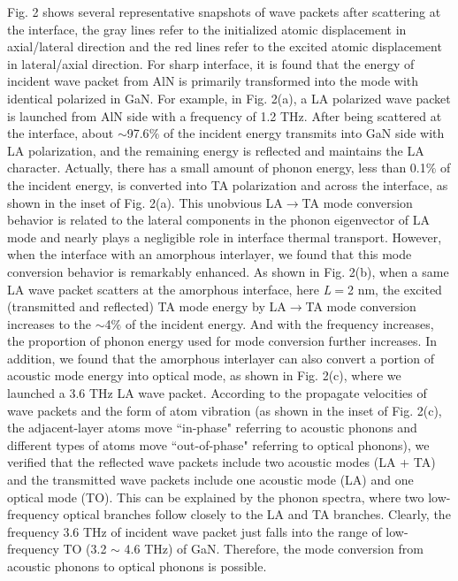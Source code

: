 \documentclass{article}
\begin{document}
Fig. 2 shows several representative snapshots of wave packets after scattering at the interface, the gray lines refer to the initialized atomic displacement in axial/lateral direction and the red lines refer to the excited atomic displacement in lateral/axial direction. For sharp interface, it is found that the energy of incident wave packet from AlN is primarily transformed into the mode with identical polarized in GaN. For example, in Fig. 2(a), a LA polarized wave packet is launched from AlN side with a frequency of 1.2 THz. After being scattered at the interface, about $\sim$97.6$\%$ of the incident energy transmits into GaN side with LA polarization, and the remaining energy is reflected and maintains the LA character. Actually, there has a small amount of phonon energy, less than 0.1$\%$ of the incident energy, is converted into TA polarization and across the interface, as shown in the inset of Fig. 2(a). This unobvious LA\( \rightarrow\)TA mode conversion behavior is related to the lateral components in the phonon eigenvector of LA mode and nearly plays a negligible role in interface thermal transport. However, when the interface with an amorphous interlayer, we found that this mode conversion behavior is remarkably enhanced. As shown in Fig. 2(b), when a same LA wave packet scatters at the amorphous interface, here \textit{L}$=$2 nm, the excited (transmitted and reflected) TA mode energy by LA\( \rightarrow\)TA mode conversion increases to the $\sim$4$\%$ of the incident energy. And with the frequency increases, the proportion of phonon energy used for mode conversion further increases. In addition, we found that the amorphous interlayer can also convert a portion of acoustic mode energy into optical mode, as shown in Fig. 2(c), where we launched a 3.6 THz LA wave packet. According to the propagate velocities of wave packets and the form of atom vibration (as shown in the inset of Fig. 2(c), the adjacent-layer atoms move ``in-phase" referring to acoustic phonons and different types of atoms move ``out-of-phase" referring to optical phonons), we verified that the reflected wave packets include two acoustic modes (LA + TA) and the transmitted wave packets include one acoustic mode (LA) and one optical mode (TO). This can be explained by the phonon spectra, where two low-frequency optical branches follow closely to the LA and TA branches. Clearly, the frequency 3.6 THz of incident wave packet just falls into the range of low-frequency TO (3.2 $\sim$ 4.6 THz) of GaN. Therefore, the mode conversion from acoustic phonons to optical phonons is possible. 
\end{document}
